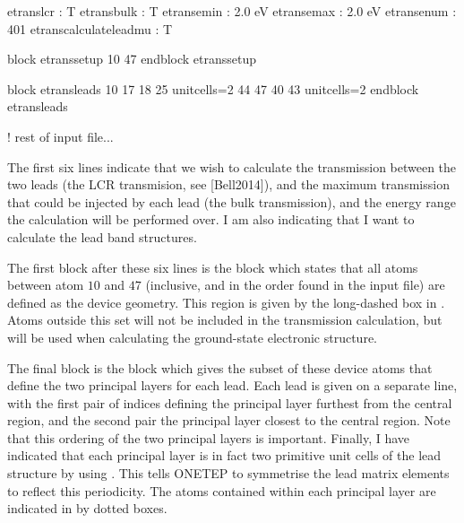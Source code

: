 \documentclass[letterpaper,10pt,english]{sphinxmanual}
\begin{document}
%
\begin{sphinxVerbatim}[commandchars=\\\{\}]
etrans\PYGZus{}lcr               : T
etrans\PYGZus{}bulk              : T
etrans\PYGZus{}emin              : \PYGZhy{}2.0 eV
etrans\PYGZus{}emax              :  2.0 eV
etrans\PYGZus{}enum              :  401
etrans\PYGZus{}calculate\PYGZus{}lead\PYGZus{}mu : T

\PYGZpc{}block etrans\PYGZus{}setup
  10  47
\PYGZpc{}endblock etrans\PYGZus{}setup

\PYGZpc{}block etrans\PYGZus{}leads
  10  17  18  25  unit\PYGZus{}cells=2
  44  47  40  43  unit\PYGZus{}cells=2
\PYGZpc{}endblock etrans\PYGZus{}leads

! rest of input file...
\end{sphinxVerbatim}

The first six lines indicate that we wish to calculate the transmission
between the two leads (the LCR transmision, see
{[}Bell2014{]}), and the maximum transmission that
could be injected by each lead (the bulk transmission), and the energy
range the calculation will be performed over. I am also indicating that
I want to calculate the lead band structures.

The first block after these six lines is the  block which
states that all atoms between atom \(10\) and \(47\) (inclusive,
and in the order found in the input file) are defined as the device
geometry. This region is given by the long-dashed box in . Atoms outside
this set will not be included in the transmission calculation, but will
be used when calculating the ground-state electronic structure.

The final block is the  block which gives the subset of
these device atoms that define the two principal layers for each lead.
Each lead is given on a separate line, with the first pair of indices
defining the principal layer furthest from the central region, and the
second pair the principal layer closest to the central region. Note that
this ordering of the two principal layers is important. Finally, I have
indicated that each principal layer is in fact two primitive unit cells
of the lead structure by using . This tells ONETEP to symmetrise
the lead matrix elements to reflect this periodicity. The atoms
contained within each principal layer are indicated in by dotted boxes.
\end{document}
